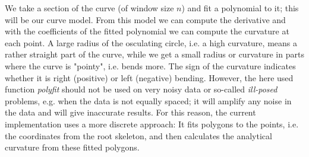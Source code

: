 

We  take a section of the curve (of window size \(n\)) and fit a polynomial to it; this will be our curve model. From this model we can compute the derivative and with the coefficients of the fitted polynomial we can compute the curvature at each point. 
A large radius of the osculating circle, i.e. a high curvature, means a rather straight part of the curve, while we get a small radius or curvature in parts where the curve is "pointy", i.e. bends more. The sign of the curvature indicates whether it is right (positive) or left (negative) bending. However, the here used function \textit{polyfit} should not be used on very noisy data or so-called \textit{ill-posed} problems, e.g. when the data is not equally spaced; it will amplify any noise in the data and will give inaccurate results.
For this reason, the current implementation uses a more discrete approach: It fits polygons to the points, i.e. the coordinates from the root skeleton, and then calculates the analytical curvature from these fitted polygons. 


%


